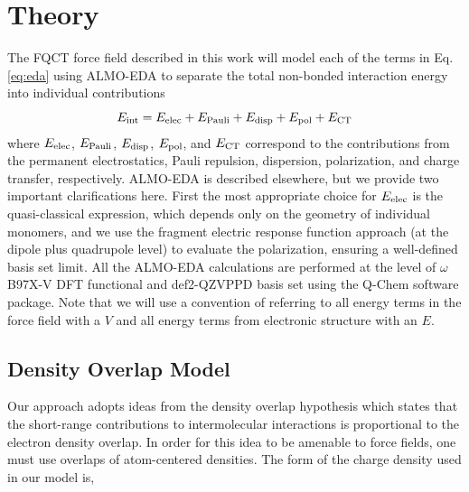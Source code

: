 \documentclass[journal=jctcce,manuscript=article]{achemso}
\begin{document}
\section*{Theory}
The FQCT force field described in this work will model each of the terms in Eq. \ref{eq:eda} using ALMO-EDA to separate the total non-bonded interaction energy into individual contributions\cite{khaliullin2007,horn2016probing}
\begin{equation}
E_{\rm int} = E_{\rm elec} + E_{\rm Pauli} + E_{\rm disp} + E_{\rm pol} +  E_{\rm CT}
 \label{eq:eda}
\end{equation}
where $E_{\rm elec}$, $E_{\rm Pauli}$, $ E_{\rm disp}$, $E_{\rm pol}$, and  $E_{\rm CT}$ correspond to the contributions from the permanent electrostatics, Pauli repulsion, dispersion, polarization, and charge transfer, respectively. ALMO-EDA is described elsewhere\cite{khaliullin2007,horn2016probing}, but we provide two important clarifications here. First the most appropriate choice for $E_{\rm elec}$ is the quasi-classical expression, which depends only on the geometry of individual monomers\cite{mao2017energy}, and we use the fragment electric response function approach (at the dipole plus quadrupole level) to evaluate the  polarization, ensuring a well-defined basis set limit.\cite{horn2015} All the ALMO-EDA calculations are performed at the level of $\omega$B97X-V DFT functional\cite{Mardirossian2014} and def2-QZVPPD basis set\cite{rappoport2010property} using the Q-Chem software package\cite{Epifanovsky2021}. Note that we will use a convention of referring to all energy terms in the force field with a $V$ and all energy terms from electronic structure with an $E$.

\subsection*{Density Overlap Model}
Our approach adopts ideas from the density overlap hypothesis\cite{kim1981dependence,wheatley1990overlap,gavezzotti2002calculation,van2016beyond,van2018new}
which states that the short-range contributions to intermolecular interactions is proportional to the electron density overlap. In order for this idea to be amenable to force fields, one must use overlaps of atom-centered
densities. The form of the charge density used in our model is,
\end{document}
